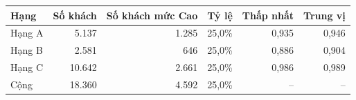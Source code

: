 \begin{tabular}{lrrrrr}
\toprule
Hạng & Số khách & Số khách mức Cao & Tỷ lệ & Thấp nhất & Trung vị \\
\midrule
Hạng A & 5.137 & 1.285 & 25,0\% & 0,935 & 0,946 \\
Hạng B & 2.581 & 646 & 25,0\% & 0,886 & 0,904 \\
Hạng C & 10.642 & 2.661 & 25,0\% & 0,986 & 0,989 \\
Cộng & 18.360 & 4.592 & 25,0\% & -- & -- \\
\bottomrule
\end{tabular}

